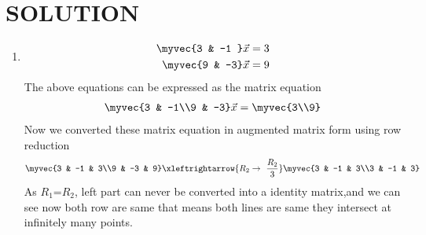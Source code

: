 \documentclass[journal,12pt,twocolumn]{IEEEtran}
\begin{document}
\section{SOLUTION}  
\begin{enumerate}
\item
\begin{align}
\begin{split}
\myvec{3 & -1 }\vec{x}&=3
\\
\myvec{9 & -3}\vec{x}&=9
\end{split}
\end{align}
The above equations can be expressed as the matrix equation
\begin{align}
\myvec{3 & -1\\9 & -3} \vec{x} = \myvec{3\\9}
\end{align}
%
Now we converted these matrix equation in augmented matrix form using row reduction
\begin{align}
\myvec{3 & -1 & 3\\9 & -3 & 9} 
\xleftrightarrow {R_2\rightarrow \ \frac{R_2}{3}}\myvec{3 & -1 & 3\\3 & -1 & 3} 
\end{align}
%
As $R_1$=$R_2$, left part can never be converted into a identity matrix,and we can see now both row are same that means both lines are same they intersect at infinitely many points.


\end{enumerate}
\end{document}
